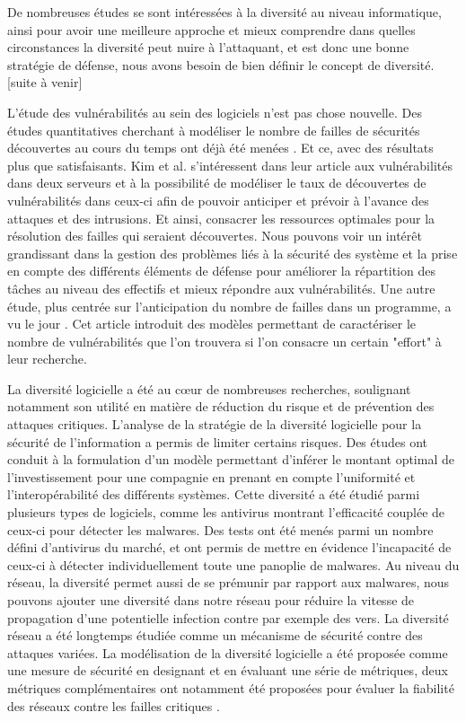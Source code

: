 De nombreuses études se sont intéressées à la diversité au niveau informatique, ainsi pour avoir une meilleure approche et mieux comprendre dans quelles circonstances la diversité peut nuire à l’attaquant, et est donc une bonne stratégie de défense, nous avons besoin de bien définir le concept de diversité. 
[suite à venir]


L'étude des vulnérabilités au sein des logiciels n'est pas chose nouvelle. Des études quantitatives cherchant à modéliser le
nombre de failles de sécurités découvertes au cours du temps ont déjà été menées \cite{vulnerabilityDiscovery}. Et ce, avec des
résultats plus que satisfaisants. Kim et al. s'intéressent dans leur article aux vulnérabilités dans deux serveurs et à la possibilité de modéliser le taux de découvertes de vulnérabilités dans ceux-ci
afin de pouvoir anticiper et prévoir à l'avance des attaques et des intrusions. Et ainsi, consacrer les ressources optimales pour la résolution des failles qui
seraient découvertes. Nous pouvons voir un intérêt grandissant dans la gestion des problèmes liés à la sécurité des système et la prise en compte des différents éléments de défense pour améliorer la répartition des tâches au niveau des effectifs et mieux répondre aux vulnérabilités. Une autre étude, plus centrée sur l'anticipation du
nombre de failles dans un programme, a vu le jour \cite{assessingVulnerabilities}. Cet article introduit des modèles
permettant de caractériser le nombre de vulnérabilités que l'on trouvera si l'on consacre un certain "effort" à leur recherche.

La diversité logicielle a été au cœur de nombreuses recherches, soulignant notamment son utilité en matière de réduction du risque \cite{softwareDiversityStateOfTheArt} et de prévention des attaques critiques. L'analyse de la stratégie de la diversité logicielle pour la sécurité de l’information a permis de limiter certains risques. Des études ont conduit à la formulation d'un modèle permettant d'inférer le montant optimal de l’investissement pour une compagnie en prenant en compte l’uniformité et l’interopérabilité des différents systèmes\cite{informationSecurity}. 
Cette diversité a été étudié parmi plusieurs types de logiciels, comme les antivirus \cite{DiversityForSecurityAntivirus}montrant l’efficacité couplée de ceux-ci pour détecter les malwares. Des tests ont été menés parmi un nombre défini d'antivirus du marché, et ont permis de mettre en évidence l'incapacité de ceux-ci à détecter individuellement toute une panoplie de malwares.
 Au niveau du réseau, la diversité permet aussi de se prémunir par rapport aux malwares, nous pouvons ajouter une diversité dans notre réseau pour réduire la vitesse de propagation d’une potentielle infection \cite{OptimisingNetwork} contre par exemple des vers. La diversité réseau a été longtemps étudiée comme un mécanisme de sécurité contre des attaques variées. La modélisation de la diversité logicielle a été proposée comme une mesure de sécurité en designant et en évaluant une série de métriques, deux métriques complémentaires ont notamment été proposées pour évaluer la fiabilité des réseaux contre les failles critiques \cite{networkDiversity}.

